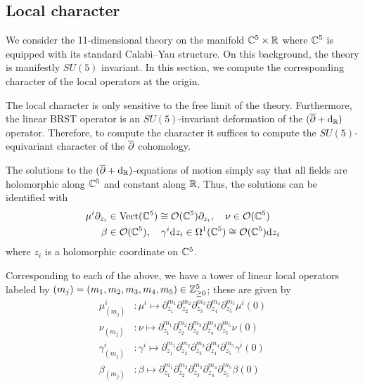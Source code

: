 \subsection{Local character}

We consider the 11-dimensional theory on the manifold $\mathbb C^5 \times \mathbb R$ where $\mathbb C^5$ is equipped with its standard Calabi--Yau structure. 
On this background, the theory is manifestly $SU(5)$ invariant. 
In this section, we compute the corresponding character of the local operators at the origin. 

The local character is only sensitive to the free limit of the theory.
Furthermore, the linear BRST operator is an $SU(5)$-invariant deformation of the $(\overline{\partial} + {\rm d}_{\mathbb R})$ operator. 
Therefore, to compute the character it suffices to compute the $SU(5)$-equivariant character of the $\overline{\partial}$ cohomology. 

The solutions to the $(\overline{\partial} + {\rm d}_{\mathbb R})$-equations of motion simply say that all fields are holomorphic along $\mathbb C^5$ and constant along $\mathbb R$. 
Thus, the solutions can be identified with 
\begin{align*}
\mu^{i}\partial_{z_i} & \in {\rm Vect}(\mathbb C^5) \cong \mathcal O(\mathbb{C}^5)\partial_{z_i},\quad 
\nu \in \mathcal O (\mathbb{C}^5) \\
\beta & \in \mathcal O (\mathbb{C}^5), \quad \gamma^{i} {\rm d} z_i \in \Omega^{1}(\mathbb C^5) \cong \mathcal O (\mathbb{C}^5){\rm d} z_i 
\end{align*}
where $z_i$ is a holomorphic coordinate on $\mathbb C^5$. 

Corresponding to each of the above, we have a tower of linear local operators labeled by $(m_j) = (m_1, m_2, m_3, m_4, m_5)\in \mathbb{Z}^5_{\geq 0}$; these are given by
\begin{align*}
 \mu^{i}_{(m_j)} &: \mu^{i}\mapsto \partial_{z_1}^{m_1}\partial_{z_2}^{m_2}\partial_{z_3}^{m_3}\partial_{z_4}^{m_4}\partial_{z_5}^{m_5}\mu^{i} (0) \\
\nu_{(m_j)} &: \nu\mapsto \partial_{z_1}^{m_1}\partial_{z_2}^{m_2}\partial_{z_3}^{m_3}\partial_{z_4}^{m_4}\partial_{z_5}^{m_5}\nu (0) \\
\gamma^{i}_{(m_j)} &: \gamma^{i}\mapsto \partial_{z_1}^{m_1}\partial_{z_2}^{m_2}\partial_{z_3}^{m_3}\partial_{z_4}^{m_4}\partial_{z_5}^{m_5}\gamma^{i} (0) \\
 \beta_{(m_j)} &: \beta\mapsto \partial_{z_1}^{m_1}\partial_{z_2}^{m_2}\partial_{z_3}^{m_3}\partial_{z_4}^{m_4}\partial_{z_5}^{m_5}\beta (0) \\
\end{align*}

